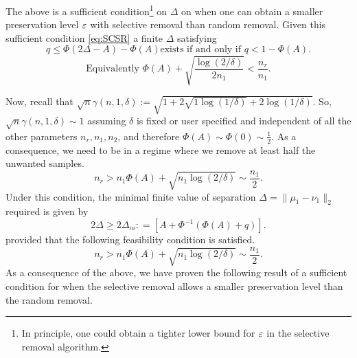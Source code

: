 \begin{remark}
The above is a sufficient condition\footnote{In principle, one could obtain a tighter lower bound for $\varepsilon$ in the selective removal algorithm.} on $\Delta$ on when one can obtain a smaller preservation level $\varepsilon$ with selective removal than random removal. Given this sufficient condition  \eqref{eq:SCSR} a finite \(\Delta\) satisfying
\[
q
\leq
\Phi(2\Delta- A) - \Phi(A)
\text{
exists if and only if }
q < 1-\Phi(A). 
\]
\[
\text{Equivalently }
\Phi(A)
+
\sqrt{\frac{\log(2/\delta)}{2n_1}}
<
\frac{n_r}{n_1}.
\]

Now, recall that $\sqrt{n} \gamma(n, 1, \delta):= \sqrt{1+2\sqrt{1 \log (1/\delta)} + 2 \log (1/\delta)}$. So, $\sqrt{n}\gamma(n,1,\delta) \sim 1$ assuming $\delta$ is fixed or user specified and independent of all the other parameters $n_r,n_1,n_2$, and therefore $\Phi(A) \sim \Phi(0) \sim \frac{1}{2}$. As a consequence, we need to be in a regime where we remove at least half the unwanted samples.
\[
n_r
>
n_1
\Phi(A)
+
\sqrt{n_1\log(2/\delta)}
\sim \frac{n_1}{2}.
\]
Under this condition, the minimal finite value of separation \(\Delta = \|\mu_1- \nu_1\|_2\) required is given by
\[
2\Delta 
\geq 
2\Delta_{m}:
=
\left[
A+
\Phi^{-1}\!\left(\Phi(A)+q\right)
\right].
\]
provided that the following feasibility condition is satisfied.
\[
n_r
>
n_1
\Phi(A)
+
\sqrt{n_1\log(2/\delta)}
\sim \frac{n_1}{2}.
\]
As a consequence of the above, we have proven the following result of a sufficient condition for when the selective removal allows a smaller preservation level than the random removal.
\end{remark}

